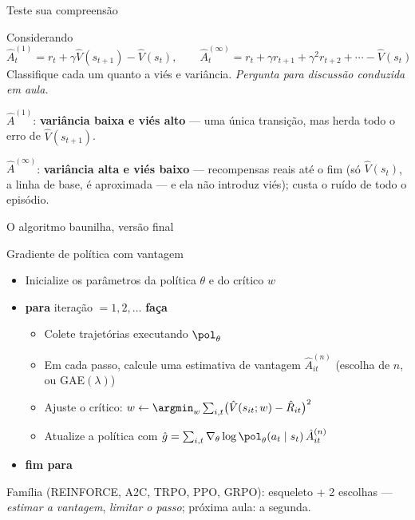 \documentclass[aspectratio=169, 11pt]{beamer}
\newcommand{\paradiscussao}{\smallskip
  {\footnotesize\color{rlCinza}\itshape Pergunta para discussão conduzida em aula.}}
\newcommand{\thv}{\theta}                       %
\newcommand{\wv}{w}                             %
\newcommand{\polth}{\pol_{\thv}}                %
\newcommand{\gth}{\nabla_{\thv}}                %
\newcommand{\Vhat}{\hat{V}}
\newcommand{\Ahat}{\hat{A}}
\begin{document}
\begin{frame}{Teste sua compreensão}

  \begin{quizbox}{}
    Considerando
    \[
      \Ahat^{(1)}_t = r_t + \gamma \Vhat(s_{t+1}) - \Vhat(s_t),
      \qquad
      \Ahat^{(\infty)}_t = r_t + \gamma r_{t+1} + \gamma^2 r_{t+2} + \cdots - \Vhat(s_t)
    \]
    Classifique cada um quanto a viés e variância.
    \paradiscussao
  \end{quizbox}

  \pause

  \begin{respbox}
    $\Ahat^{(1)}$: \textbf{variância baixa e viés alto} --- uma única
    transição, mas herda todo o erro de $\Vhat(s_{t+1})$.

    \smallskip
    $\Ahat^{(\infty)}$: \textbf{variância alta e viés baixo} --- recompensas
    reais até o fim (só $\Vhat(s_t)$, a linha de base, é aproximada --- e ela
    não introduz viés); custa o ruído de todo o episódio.
  \end{respbox}
\end{frame}

\begin{frame}{O algoritmo baunilha, versão final}

  \begin{algbox}{Gradiente de política com vantagem}
    {\footnotesize
    \begin{itemize}\setlength{\itemsep}{0.15ex}
      \item Inicialize os parâmetros da política $\thv$ e do crítico $\wv$
      \item \textbf{para} iteração $=1,2,\dots$ \textbf{faça}
        \begin{itemize}\setlength{\itemsep}{0.1ex}
          \item Colete trajetórias executando $\polth$
          \item Em cada passo, calcule uma estimativa de vantagem
            $\Ahat^{(n)}_{it}$ (escolha de $n$, ou GAE$(\lambda)$)
          \item Ajuste o crítico: $\wv \leftarrow \argmin_{\wv}
            \sum_{i,t}\bigl(\Vhat(s_{it};\wv) - \hat{R}_{it}\bigr)^2$
          \item Atualize a política com
            $\hat{g} = \sum_{i,t}\gth \log \polth(a_t\mid s_t)\,\Ahat^{(n)}_{it}$
        \end{itemize}
      \item \textbf{fim para}
    \end{itemize}}
  \end{algbox}

  \vspace{-0.4em}
  \begin{ideiabox}
    Família (REINFORCE, A2C, TRPO, PPO, GRPO): esqueleto + 2 escolhas ---
    \emph{estimar a vantagem}, \emph{limitar o passo}; próxima aula: a segunda.
  \end{ideiabox}
\end{frame}
\end{document}
